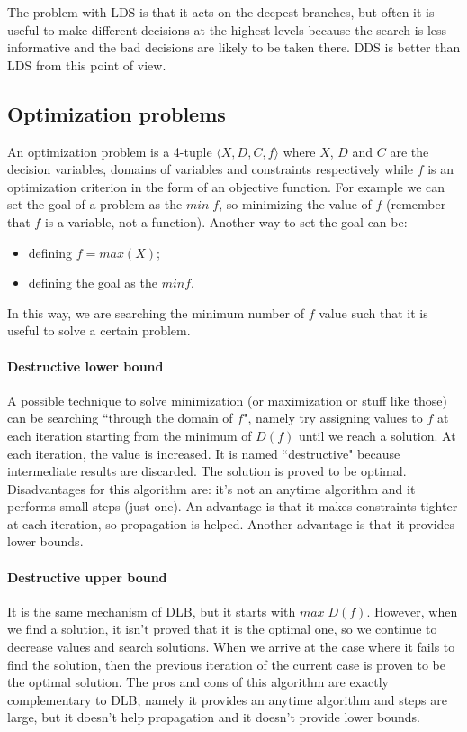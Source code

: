 \documentclass[10pt,a4paper]{article}
\begin{document}
The problem with LDS is that it acts on the deepest branches, but often it is
useful to make different decisions at the highest levels because the search is
less informative and the bad decisions are likely to be taken there. DDS is
better than LDS from this point of view.

\subsection{Optimization problems}
An optimization problem is a 4-tuple $\langle X, D, C, f \rangle$ where $X$,
$D$ and $C$ are the decision variables, domains of variables and constraints
respectively while $f$ is an optimization criterion in the form of an objective
function. For example we can set the goal of a problem as the $min \; f$, so
minimizing the value of $f$ (remember that $f$ is a variable, not a function).
Another way to set the goal can be:

\begin{itemize}
    \item defining $f = max(X)$;
    \item defining the goal as the $min f$.
\end{itemize}
In this way, we are searching the minimum number of $f$ value such that it is
useful to solve a certain problem.

\paragraph{Destructive lower bound}
A possible technique to solve minimization (or maximization or stuff like those)
can be searching ``through the domain of $f$", namely try assigning values to $f
$ at each iteration starting from the minimum of $D(f)$ until we reach a
solution. At each iteration, the value is increased. It is named ``destructive"
because intermediate results are discarded. The solution is proved to be
optimal. Disadvantages for this algorithm are: it's not an anytime algorithm and
it performs small steps (just one). An advantage is that it makes constraints
tighter at each iteration, so propagation is helped. Another advantage is that
it provides lower bounds.

\paragraph{Destructive upper bound}
It is the same mechanism of DLB, but it starts with $max \; D(f)$. However, when
we find a solution, it isn't proved that it is the optimal one, so we continue
to decrease values and search solutions. When we arrive at the case where it
fails to find the solution, then the previous iteration of the current case is
proven to be the optimal solution. The pros and cons of this algorithm are
exactly complementary to DLB, namely it provides an anytime algorithm and steps
are large, but it doesn't help propagation and it doesn't provide lower bounds.
\end{document}
